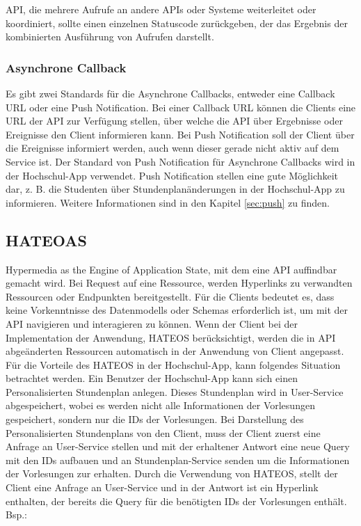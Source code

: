 API, die mehrere Aufrufe an andere APIs oder Systeme weiterleitet oder koordiniert, sollte einen einzelnen Statuscode zurückgeben, der das Ergebnis der kombinierten Ausführung von Aufrufen darstellt.

\subsubsection{Asynchrone Callback}
Es gibt zwei Standards für die Asynchrone Callbacks, entweder eine Callback URL oder eine Push Notification. Bei einer Callback URL können die Clients eine URL der API zur Verfügung stellen, über welche die API über Ergebnisse oder Ereignisse den Client informieren kann. Bei Push Notification soll der Client über die Ereignisse informiert werden, auch wenn dieser gerade nicht aktiv auf dem Service ist. Der Standard von Push Notification für Asynchrone Callbacks wird in der Hochschul-App verwendet. Push Notification stellen eine gute Möglichkeit dar, z. B. die Studenten über Stundenplanänderungen in der Hochschul-App zu informieren. Weitere Informationen sind in den Kapitel \ref{sec:push} zu finden.

\subsection{HATEOAS}
Hypermedia as the Engine of Application State, mit dem eine API auffindbar gemacht wird. Bei Request auf eine Ressource, werden Hyperlinks zu verwandten Ressourcen oder Endpunkten bereitgestellt. Für die Clients bedeutet es, dass keine Vorkenntnisse des Datenmodells oder Schemas erforderlich ist, um mit der API navigieren und interagieren zu können. Wenn der Client bei der Implementation der Anwendung, HATEOS berücksichtigt, werden die in API abgeänderten Ressourcen automatisch in der Anwendung von Client angepasst.\\

Für die Vorteile des HATEOS in der Hochschul-App, kann folgendes Situation betrachtet werden. Ein Benutzer der Hochschul-App kann sich einen Personalisierten Stundenplan anlegen. Dieses Stundenplan wird in User-Service abgespeichert, wobei es werden nicht alle Informationen der Vorlesungen gespeichert, sondern nur die IDs der Vorlesungen. Bei Darstellung des Personalisierten Stundenplans von den Client, muss der Client zuerst eine Anfrage an User-Service stellen und mit der erhaltener Antwort eine neue Query mit den IDs aufbauen und an Stundenplan-Service senden um die Informationen der Vorlesungen zur erhalten. Durch die Verwendung von HATEOS, stellt der Client eine Anfrage an User-Service und in der Antwort ist ein Hyperlink enthalten, der bereits die Query für die benötigten IDs der Vorlesungen enthält.
Bsp.:


